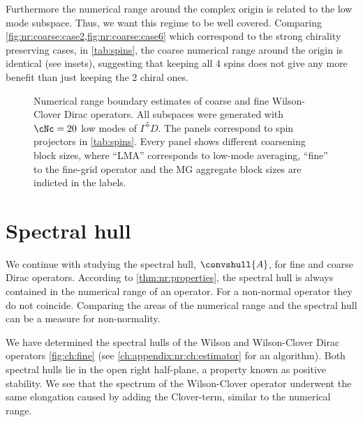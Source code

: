 Furthermore the numerical range around the complex origin is related to the low mode subspace.
Thus, we want this regime to be well covered.
Comparing \cref{fig:nr:coarse:case2,fig:nr:coarse:case6} which correspond to the strong chirality preserving cases,  in \cref{tab:spins}, the coarse numerical range around the origin is identical (see insets), suggesting that keeping all \num{4} spins does not give any more benefit than just keeping the \num{2} chiral ones.

\begin{figure}
\centering

\hfill
{}

\hfill
{}

\caption{
Numerical range boundary estimates of coarse and fine Wilson-Clover Dirac operators.
All subspaces were generated with $\cNc=20$ low modes of $\Gamma^{5} D$.
The panels correspond to spin projectors in \cref{tab:spins}.
Every panel shows different coarsening block sizes, where ``LMA'' corresponds to low-mode averaging, ``fine'' to the fine-grid operator and the MG aggregate block sizes are indicted in the labels.
}
\label{fig:nr:coarse}
\end{figure}

\section{Spectral hull}
\label{sec:chirality:sh}

We continue with studying the spectral hull, $\convshull{A}$, for fine and coarse Dirac operators.
According to \cref{thm:nr:properties}, the spectral hull is always contained in the numerical range of an operator.
For a non-normal operator they do not coincide.
Comparing the areas of the numerical range and the spectral hull can be a measure for non-normality.

We have determined the spectral hulls of the Wilson and Wilson-Clover Dirac operators \cref{fig:ch:fine} (see \cref{ch:appendix:nr:ch:estimator} for an algorithm).
Both spectral hulls lie in the open right half-plane, a property known as positive stability.
We see that the spectrum of the Wilson-Clover operator underwent the same elongation caused by adding the Clover-term, similar to the numerical range.

